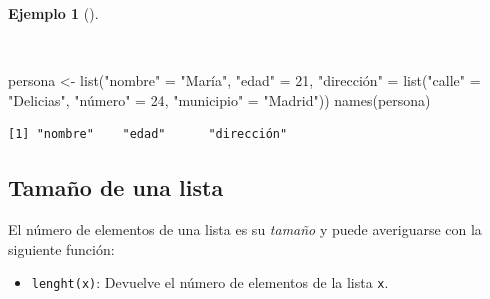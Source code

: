 \documentclass[
  a4paper,
]{scrreport}
\newenvironment{Shaded}{\begin{snugshade}}{\end{snugshade}}
\newcommand{\DecValTok}[1]{\textcolor[rgb]{0.68,0.00,0.00}{#1}}
\newcommand{\FunctionTok}[1]{\textcolor[rgb]{0.28,0.35,0.67}{#1}}
\newcommand{\NormalTok}[1]{\textcolor[rgb]{0.00,0.23,0.31}{#1}}
\newcommand{\OtherTok}[1]{\textcolor[rgb]{0.00,0.23,0.31}{#1}}
\newcommand{\StringTok}[1]{\textcolor[rgb]{0.13,0.47,0.30}{#1}}
\providecommand{\tightlist}{%
  \setlength{\itemsep}{0pt}\setlength{\parskip}{0pt}}\usepackage{longtable,booktabs,array}
\theoremstyle{definition}
\theoremstyle{definition}
\newtheorem{example}{Ejemplo}[chapter]
\theoremstyle{remark}
\begin{document}
\begin{example}[]\protect\hypertarget{exm-acceso-listas}{}\label{exm-acceso-listas}

~

\begin{Shaded}
\begin{Highlighting}[]
\NormalTok{persona }\OtherTok{\textless{}{-}} \FunctionTok{list}\NormalTok{(}\StringTok{"nombre"} \OtherTok{=} \StringTok{"María"}\NormalTok{, }\StringTok{"edad"} \OtherTok{=} \DecValTok{21}\NormalTok{, }\StringTok{"dirección"} \OtherTok{=} \FunctionTok{list}\NormalTok{(}\StringTok{"calle"} \OtherTok{=} \StringTok{"Delicias"}\NormalTok{, }\StringTok{"número"} \OtherTok{=} \DecValTok{24}\NormalTok{, }\StringTok{"municipio"} \OtherTok{=} \StringTok{"Madrid"}\NormalTok{))}
\FunctionTok{names}\NormalTok{(persona)}
\end{Highlighting}
\end{Shaded}

\begin{verbatim}
[1] "nombre"    "edad"      "dirección"
\end{verbatim}

\end{example}

\subsection{Tamaño de una lista}\label{tamauxf1o-de-una-lista}

El número de elementos de una lista es su \emph{tamaño} y puede
averiguarse con la siguiente función:

\begin{itemize}
\tightlist
\item
  \texttt{lenght(x)}: Devuelve el número de elementos de la lista
  \texttt{x}.
\end{itemize}
\end{document}
